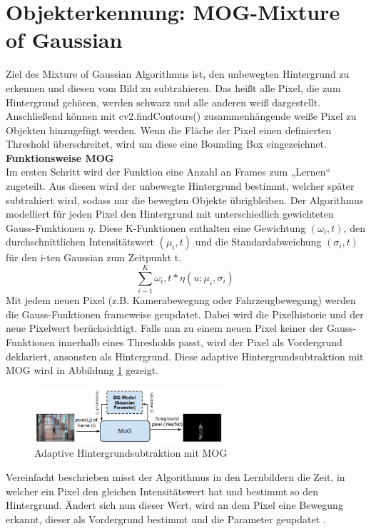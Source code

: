 \documentclass[conference]{IEEEtran}
\begin{document}
	
	\section{Objekterkennung: MOG-Mixture of Gaussian}
	Ziel des Mixture of Gaussian Algorithmus ist, den unbewegten Hintergrund zu erkennen und diesen vom Bild zu subtrahieren. Das heißt alle Pixel, die zum Hintergrund gehören, werden schwarz und alle anderen weiß dargestellt. Anschließend können mit cv2.findContours() zusammenhängende weiße Pixel zu Objekten hinzugefügt werden. Wenn die Fläche der Pixel einen definierten Threshold überschreitet, wird um diese eine Bounding Box eingezeichnet.\\
	\textbf{Funktionsweise MOG}\\
	Im ersten Schritt wird der Funktion eine Anzahl an Frames zum „Lernen“ zugeteilt. Aus diesen wird der unbewegte Hintergrund bestimmt, welcher später subtrahiert wird, sodass nur die bewegten Objekte übrigbleiben.
	Der Algorithmus modelliert für jeden Pixel den Hintergrund mit unterschiedlich gewichteten Gauss-Funktionen $\eta$.  Diese K-Funktionen enthalten eine Gewichtung $(\omega_i,t)$, den durchschnittlichen Intensitätswert $(\mu_i,t)$ und die Standardabweichung $(\sigma_i,t)$ für den i-ten Gaussian zum Zeitpunkt t.
	\[ \sum_{i-1}^{K} \omega_i,t * \eta(u; \mu_i,\sigma_i)  \]
	Mit jedem neuen Pixel (z.B. Kamerabewegung oder Fahrzeugbewegung) werden die Gauss-Funktionen frameweise geupdatet. Dabei wird die Pixelhistorie und der neue Pixelwert berücksichtigt. Falls nun zu einem neuen Pixel keiner der Gauss-Funktionen innerhalb eines Thresholds passt, wird der Pixel als Vordergrund deklariert, ansonsten als Hintergrund. Diese adaptive Hintergrundsubtraktion mit MOG wird in Abbildung \ref{mogKonzept} gezeigt.\\
	\begin{figure}[!h]
		\begin{center}
			\includegraphics[width=7cm]{Media/MOGKONZEPt.png}
			\caption{Adaptive Hintergrundsubtraktion mit MOG \cite{mog1}}
			\label{mogKonzept}
		\end{center}
	\end{figure}
	Vereinfacht beschrieben misst der Algorithmus in den Lernbildern die Zeit, in welcher ein Pixel den gleichen Intensitätswert hat und bestimmt so den Hintergrund. Ändert sich nun dieser Wert, wird an dem Pixel eine Bewegung erkannt, dieser als Vordergrund bestimmt und die Parameter geupdatet \cite{m1}\cite{m2}\cite{m3}\cite{m4}.\\
\end{document}
